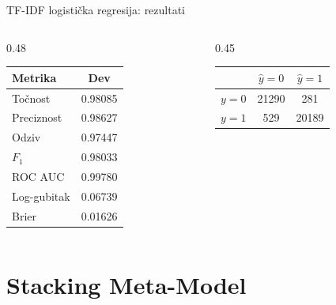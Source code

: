 \documentclass[aspectratio=169]{beamer}
\begin{document}
\begin{frame}{TF-IDF logistička regresija: rezultati}
    \centering
    \begin{columns}[T]
        \begin{column}{0.48\textwidth}
            \begin{tabular}{@{}lc@{}}
                \toprule
                \textbf{Metrika} & \textbf{Dev} \\ \midrule
                Točnost & 0.98085 \\
                Preciznost & 0.98627 \\
                Odziv & 0.97447 \\
                $F_1$ & 0.98033 \\
                ROC AUC & 0.99780 \\
                Log-gubitak & 0.06739 \\
                Brier & 0.01626 \\ \bottomrule
            \end{tabular}
        \end{column}
        \begin{column}{0.45\textwidth}
            \begin{tabular}{@{}lcc@{}}
                \toprule
                & $\hat y=0$ & $\hat y=1$ \\ \midrule
                $y=0$ & 21290 & 281 \\
                $y=1$ & 529 & 20189 \\ \bottomrule
            \end{tabular}

            \vspace{3mm}
        \end{column}
    \end{columns}
\end{frame}

\section{Stacking Meta-Model}
\end{document}
